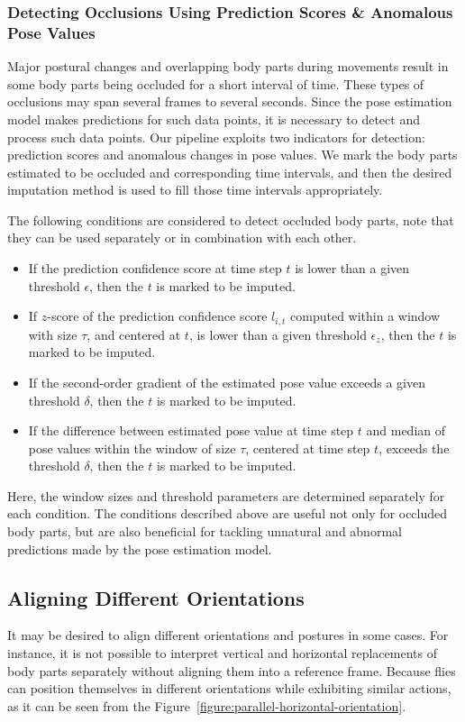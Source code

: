 \subsubsection{Detecting Occlusions Using Prediction Scores \& Anomalous Pose Values}
Major postural changes and overlapping body parts during movements result in some body parts being occluded for a short interval of time.
These types of occlusions may span several frames to several seconds.
Since the pose estimation model makes predictions for such data points, it is necessary to detect and process such data points.
Our pipeline exploits two indicators for detection: prediction scores and anomalous changes in pose values.
We mark the body parts estimated to be occluded and corresponding time intervals, and then the desired imputation method is used to fill those time intervals appropriately.

The following conditions are considered to detect occluded body parts, note that they can be used separately or in combination with each other.
\begin{itemize}
	\item If the prediction confidence score at time step $t$ is lower than a given threshold $\epsilon$, then the $t$ is marked to be imputed.
	\item If $z$-score of the prediction confidence score $l_{i,t}$ computed within a window with size $\tau$, and centered at $t$, is lower than a given threshold $\epsilon_z$, then the $t$ is marked to be imputed.
	\item If the second-order gradient of the estimated pose value exceeds a given threshold $\delta$, then the $t$ is marked to be imputed.
	\item If the difference between estimated pose value at time step $t$ and median of pose values within the window of size $\tau$, centered at time step $t$, exceeds the threshold $\delta$, then the $t$ is marked to be imputed.
\end{itemize}
Here, the window sizes and threshold parameters are determined separately for each condition.
The conditions described above are useful not only for occluded body parts, but are also beneficial for tackling unnatural and abnormal predictions made by the pose estimation model.

\subsection{Aligning Different Orientations}
It may be desired to align different orientations and postures in some cases.
For instance, it is not possible to interpret vertical and horizontal replacements of body parts separately without aligning them into a reference frame.
Because flies can position themselves in different orientations while exhibiting similar actions, as it can be seen from the Figure~\ref{figure:parallel-horizontal-orientation}. %

